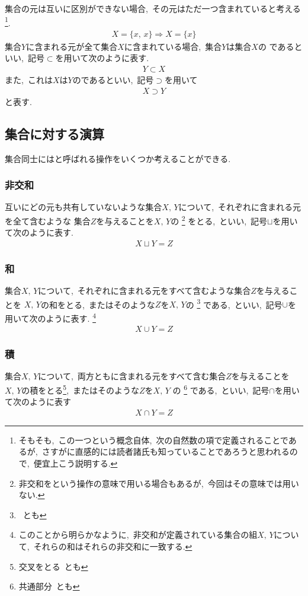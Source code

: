 \documentclass[hyperref,a4paper,12pt]{kininaruki}
\begin{document}
集合の元は互いに区別ができない場合,\, その元はただ一つ含まれていると考える\footnote{そもそも,\, 
この一つという概念自体,\, 次の自然数の項で定義されることであるが,\, 
さすがに直感的には読者諸氏も知っていることであろうと思われるので,\, 便宜上こう説明する.}.
\begin{align}
    X = \{x,\, x\} \Rightarrow X = \{x\}
\end{align}
集合$Y$に含まれる元が全て集合$X$に含まれている場合,\, 集合$Y$は集合$X$の
であるといい,\, 
記号$\subset$を用いて次のように表す.
\begin{align}
    Y \subset X
\end{align}
また,\, これは$X$は$Y$のであるといい,\, 記号$\supset$を用いて
\begin{align}
    X \supset Y
\end{align}
と表す.
\newpage
\subsection{集合に対する演算}
集合同士にはと呼ばれる操作をいくつか考えることができる.
\subsubsection{非交和}
互いにどの元も共有していないような集合$X,\, Y$について,\, それぞれに含まれる元を全て含むような
集合$Z$を与えることを$X,\, Y$の
\footnote{非交和をという操作の意味で用いる場合もあるが,\, 今回はその意味では用いない.}
をとる,\, といい,\, 記号$\sqcup$を用いて次のように表す.
\begin{align}
    X \sqcup Y = Z
\end{align}
\emptyline
\subsubsection{和}
集合$X,\, Y$について,\, それぞれに含まれる元をすべて含むような集合$Z$を与えることを
$X,\, Y$の和をとる,\, またはそのような$Z$を$X,\, Y$の
\footnote{\, とも}
である,\, といい,\, 記号$\cup$を用いて次のように表す.
\footnote{このことから明らかなように,\, 非交和が定義されている集合の組$X,\, Y$について,\, 
それらの和はそれらの非交和に一致する.}
\begin{align}
    X \cup Y = Z
\end{align}
\subsubsection{積}
集合$X,\, Y$について,\, 両方ともに含まれる元をすべて含む集合$Z$を与えることを
$X,\, Y$の積をとる\footnote{交叉をとる\, とも},\, またはそのような$Z$を$X,\, Y$%
の
\footnote{共通部分\, とも}
である,\, といい,\, 記号$\cap$を用いて次のように表す
\begin{align}
    X \cap Y =Z
\end{align}
\newpage
\end{document}
